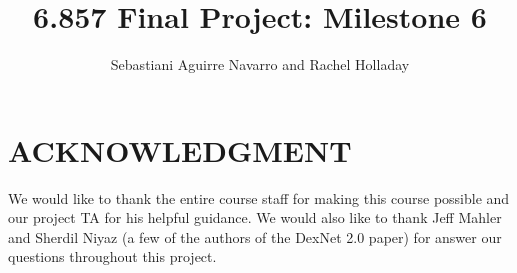 \documentclass[letterpaper, 10 pt, conference]{../ieeeconf}
\begin{document}
\title{6.857 Final Project: Milestone 6}
\author{Sebastiani Aguirre Navarro and Rachel Holladay}
\maketitle









\addtolength{\textheight}{-12cm}

\section*{ACKNOWLEDGMENT}
We would like to thank the entire course staff for making this course possible and our project TA for his helpful guidance. 
We would also like to thank Jeff Mahler and Sherdil Niyaz (a few of the authors of the DexNet 2.0 paper) for answer our questions throughout this project. 

{\footnotesize
    
}
\end{document}
